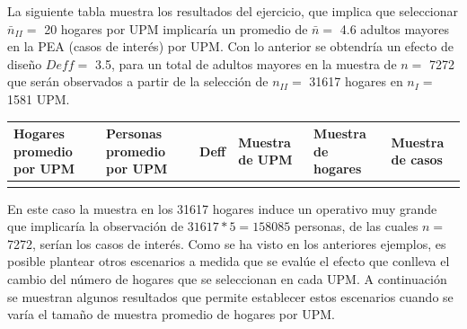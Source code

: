 \documentclass[
  10pt,
  spanish,
]{book}
\begin{document}
La siguiente tabla muestra los resultados del ejercicio, que implica que seleccionar \(\bar{n}_{II} =\) 20 hogares por UPM implicaría un promedio de \(\bar{n} =\) 4.6 adultos mayores en la PEA (casos de interés) por UPM. Con lo anterior se obtendría un efecto de diseño \(Deff =\) 3.5, para un total de adultos mayores en la muestra de \(n =\) 7272 que serán observados a partir de la selección de \(n_{II} =\) 31617 hogares en \(n_{I} =\) 1581 UPM.

\begin{longtable}[]{@{}
  >{\centering\arraybackslash}p{}
  >{\centering\arraybackslash}p{}
  >{\centering\arraybackslash}p{}
  >{\centering\arraybackslash}p{}
  >{\centering\arraybackslash}p{}
  >{\centering\arraybackslash}p{}@{}}
\toprule
Hogares promedio por UPM & Personas promedio por UPM & Deff & Muestra de UPM & Muestra de hogares & Muestra de casos \\
\midrule
\endhead
20 & 4.6 & 3.5 & 1581 & 31617 & 7272 \\
\bottomrule
\end{longtable}

En este caso la muestra en los 31617 hogares induce un operativo muy grande que implicaría la observación de \(31617 * 5 = 158085\) personas, de las cuales \(n =\) 7272, serían los casos de interés. Como se ha visto en los anteriores ejemplos, es posible plantear otros escenarios a medida que se evalúe el efecto que conlleva el cambio del número de hogares que se seleccionan en cada UPM. A continuación se muestran algunos resultados que permite establecer estos escenarios cuando se varía el tamaño de muestra promedio de hogares por UPM.
\end{document}

